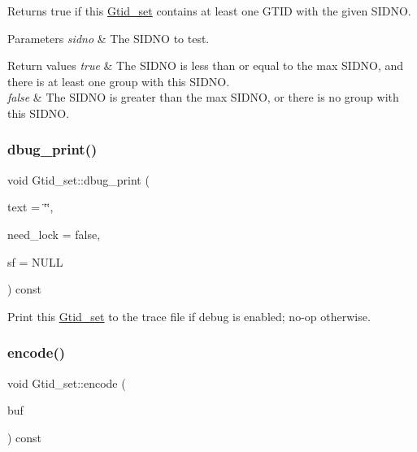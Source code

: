 Returns true if this \mbox{\hyperlink{classGtid__set}{Gtid\+\_\+set}} contains at least one G\+T\+ID with the given S\+I\+D\+NO.


\begin{DoxyParams}{Parameters}
{\em sidno} & The S\+I\+D\+NO to test. \\
\hline
\end{DoxyParams}

\begin{DoxyRetVals}{Return values}
{\em true} & The S\+I\+D\+NO is less than or equal to the max S\+I\+D\+NO, and there is at least one group with this S\+I\+D\+NO. \\
\hline
{\em false} & The S\+I\+D\+NO is greater than the max S\+I\+D\+NO, or there is no group with this S\+I\+D\+NO. \\
\hline
\end{DoxyRetVals}
\mbox{\label{classGtid__set_a9f1ff7200f92ce9911347ba459176ecd}} 
\subsubsection{\texorpdfstring{dbug\+\_\+print()}{dbug\_print()}}
{\footnotesize\ttfamily void Gtid\+\_\+set\+::dbug\+\_\+print (\begin{DoxyParamCaption}\item[{const char $\ast$}]{text = {\ttfamily \char`\"{}\char`\"{}},  }\item[{bool}]{need\+\_\+lock = {\ttfamily false},  }\item[{const \mbox{\hyperlink{structGtid__set_1_1String__format}{Gtid\+\_\+set\+::\+String\+\_\+format}} $\ast$}]{sf = {\ttfamily NULL} }\end{DoxyParamCaption}) const\hspace{0.3cm}{\ttfamily [inline]}}

Print this \mbox{\hyperlink{classGtid__set}{Gtid\+\_\+set}} to the trace file if debug is enabled; no-\/op otherwise. \mbox{\label{classGtid__set_a036d17fc704667febec3777422f164cd}} 
\subsubsection{\texorpdfstring{encode()}{encode()}}
{\footnotesize\ttfamily void Gtid\+\_\+set\+::encode (\begin{DoxyParamCaption}\item[{uchar $\ast$}]{buf }\end{DoxyParamCaption}) const}

